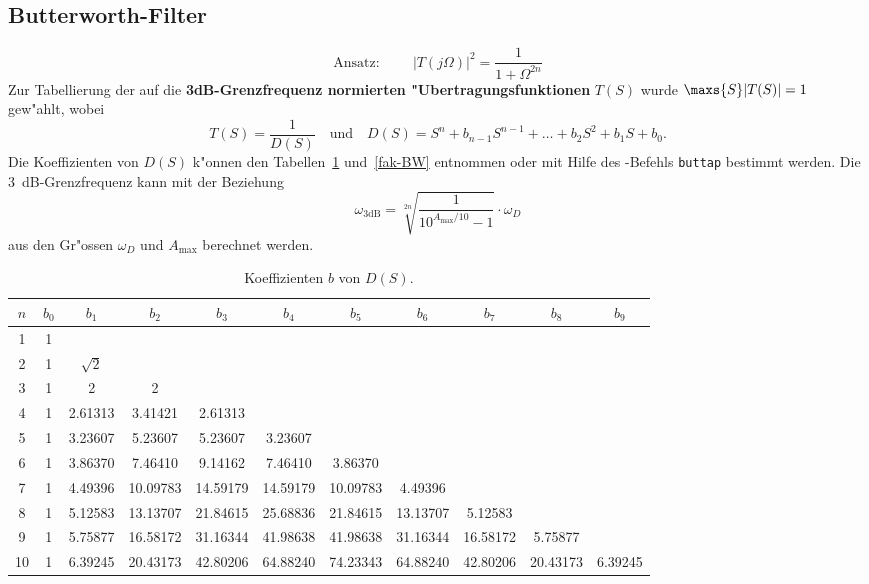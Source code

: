 \subsection{Butterworth-Filter}
\[ \mbox{Ansatz:} \hspace{1cm} |T(j\Omega)|^{2}=\frac{1}{1+\Omega^{2n}} \]
Zur Tabellierung der auf die {\bf 3dB-Grenzfrequenz normierten
"Ubertragungsfunktionen} $T(S)$ wurde $\maxs{S}|T(S)|=1$ gew"ahlt, wobei
\begin{equation*}
T(S)=\frac{1}{D(S)}\quad\text{und}\quad D(S)=S^{n}+b_{n-1}S^{n-1}+ \ldots + b_{2}S^{2}+b_{1}S+b_{0}. 
\end{equation*}
Die Koeffizienten von $D(S)$ k"onnen den Tabellen~\ref{koef-BW}
und~\ref{fak-BW} entnommen oder mit Hilfe des \matlogo-Befehls {\tt buttap}
bestimmt werden.  Die 3~dB-Grenzfrequenz kann mit der Beziehung
\[ \omega_{\text{3dB}}=\sqrt[2n]{\frac{1}{10^{A_{\max}/10}-1}}\cdot \omega_{D}\]
aus den Gr"ossen $\omega_{D}$ und $A_{\max}$ berechnet werden.
\begin{table}[!htb]
\begin{center}
{\scriptsize
\begin{tabular}{|c||c|c|c|c|c|c|c|c|c|c| }\hline
$n$ & $b_0$ & $b_1$ & $b_2$ & $b_3$ & $b_4$ & $b_5$ & $b_6$ & $b_7$ & $b_8$ & $b_9$ \\ \hline\hline
  1 & 1 & & & & & & & & &   \\ \hline
 2 & 1 & $\sqrt{2}$ & & & & & & & & \\ \hline
 3 & 1 & 2       & 2 & & & & &  & & \\ \hline
 4 & 1 & 2.61313 & 3.41421 & 2.61313 & & & & & & \\ \hline
 5 & 1 & 3.23607 & 5.23607 & 5.23607 & 3.23607 & & & & &  \\ \hline
 6 & 1 & 3.86370 & 7.46410 & 9.14162 & 7.46410 & 3.86370 & & & & \\ \hline   
 7 & 1 & 4.49396 & 10.09783 & 14.59179 & 14.59179 & 10.09783 & 4.49396 & & &  \\ \hline   
 8 & 1 & 5.12583 & 13.13707 & 21.84615 & 25.68836 & 21.84615 & 13.13707 & 5.12583 & & \\ \hline
 9 & 1 & 5.75877 & 16.58172 & 31.16344 & 41.98638 & 41.98638 & 31.16344 & 16.58172 & 5.75877  & \\ \hline
 10 & 1 &  6.39245 & 20.43173 & 42.80206 & 64.88240 & 74.23343 & 64.88240 & 42.80206 & 20.43173 & 6.39245  \\ \hline
\end{tabular}\vspace*{-2mm}\caption{Koeffizienten $b$ von $D(S)$. \label{koef-BW}}
}
\end{center}
\vspace*{-8mm}
\end{table}~\\
